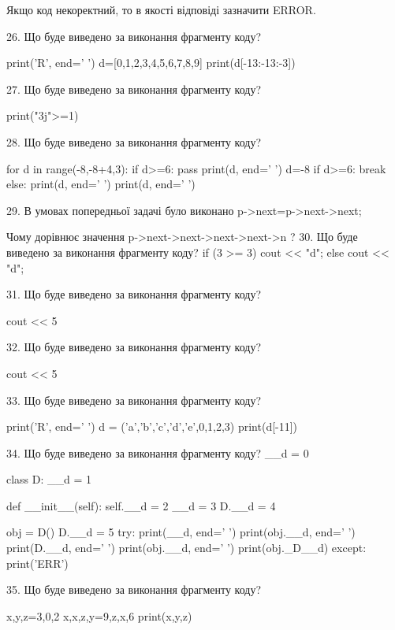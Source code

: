 \documentclass[11pt]{article}
\begin{document}
Якщо код некоректний, то в якості відповіді зазначити ERROR.



26. Що буде виведено за виконання фрагменту коду?

print('R', end=' ')
d=[0,1,2,3,4,5,6,7,8,9]
print(d[-13:-13:-3])


27. Що буде виведено за виконання фрагменту коду?

print("3j">=1)

28. Що буде виведено за виконання фрагменту коду?

for d in range(-8,-8+4,3):
    if d>=6:
        pass
    print(d, end=' ')
    d=-8
    if d>=6:
        break
else:
    print(d, end=' ')
print(d, end=' ')

29. 
В умовах попередньої задачі було виконано p->next=p->next->next;

Чому дорівнює значення p->next->next->next->next->n ?
30. Що буде виведено за виконання фрагменту коду?
if (3 >= 3)
    cout << "d";
else
    cout << "d";


31. Що буде виведено за виконання фрагменту коду?

cout << 5 %

32. Що буде виведено за виконання фрагменту коду?

cout << 5 %

33. Що буде виведено за виконання фрагменту коду?

print('R', end=' ')
d = ('a','b','c','d','e',0,1,2,3)
print(d[-11])


34. Що буде виведено за виконання фрагменту коду?
__d = 0

class D:
    __d = 1
    
    def __init__(self):
        self.__d = 2
        __d = 3
        D.__d = 4

obj = D()
D.__d = 5
try:
    print(__d, end=' ')
    print(obj.__d, end=' ')
    print(D.__d, end=' ')
    print(obj.__d, end=' ')
    print(obj._D__d)
except:
    print('ERR')

35. Що буде виведено за виконання фрагменту коду?

x,y,z=3,0,2
x,x,z,y=9,z,x,6
print(x,y,z)
\end{document}
